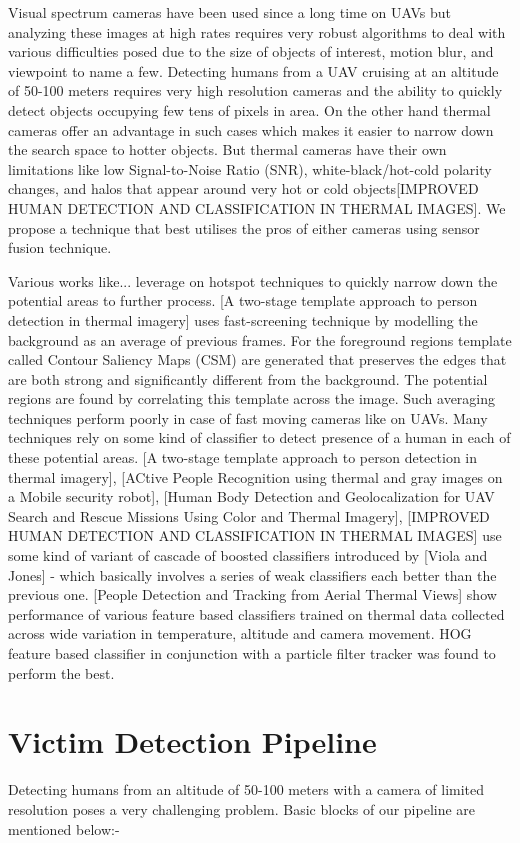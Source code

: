\documentclass[runningheads]{llncs}
\begin{document}
Visual spectrum cameras have been used since a long time on UAVs but analyzing these images at high rates requires very robust algorithms to deal with various difficulties posed due to the size of objects of interest, motion blur, and viewpoint to name a few. Detecting humans from a UAV cruising at an altitude of 50-100 meters requires very high resolution cameras and the ability to quickly detect objects occupying few tens of pixels in area. On the other hand thermal cameras offer an advantage in such cases which makes it easier to narrow down the search space to hotter objects. But thermal cameras have their own limitations like low Signal-to-Noise Ratio (SNR), white-black/hot-cold polarity changes, and halos that appear around very hot or cold objects[IMPROVED HUMAN DETECTION AND CLASSIFICATION IN THERMAL IMAGES]. We propose a technique that best utilises the pros of either cameras using sensor fusion technique.

Various works like... leverage on hotspot techniques to quickly narrow down the potential areas to further process. [A two-stage template approach to person detection in thermal imagery] uses fast-screening technique by modelling the background as an average of previous frames. For the foreground regions template called Contour Saliency Maps (CSM) are generated that preserves the edges that are both strong and significantly different from the background. The potential regions are found by correlating this template across the image. Such averaging techniques perform poorly in case of fast moving cameras like on UAVs. Many techniques rely on some kind of classifier to detect presence of a human in each of these potential areas. [A two-stage template approach to person detection in thermal imagery], [ACtive People Recognition using thermal and gray images on a Mobile security robot], [Human Body Detection and Geolocalization for UAV Search and Rescue Missions Using Color and Thermal Imagery], [IMPROVED HUMAN DETECTION AND CLASSIFICATION IN THERMAL IMAGES] use some kind of variant of cascade of boosted classifiers introduced by [Viola and Jones] - which basically involves a series of weak classifiers each better than the previous one. [People Detection and Tracking from Aerial Thermal Views] show performance of various feature based classifiers trained on thermal data collected across wide variation in temperature, altitude and camera movement. HOG feature based classifier in conjunction with a particle filter tracker was found to perform the best.

\section{Victim Detection Pipeline}
Detecting humans from an altitude of 50-100 meters with a camera of limited resolution poses a very challenging problem. Basic blocks of our pipeline are mentioned below:-
\end{document}

